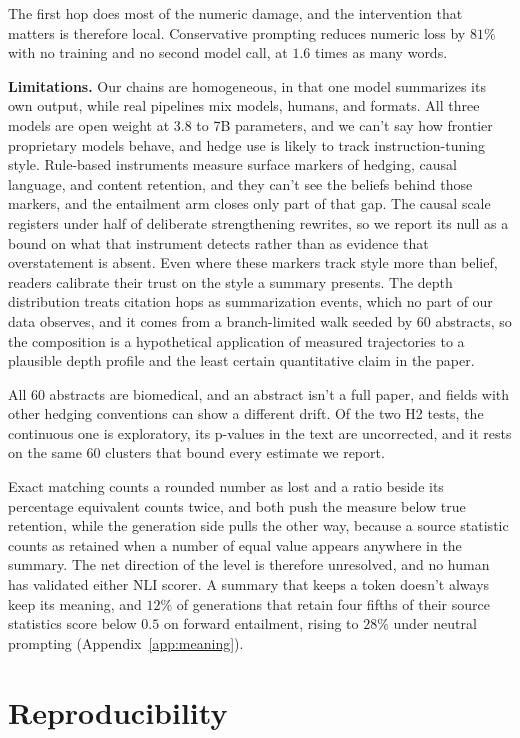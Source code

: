 \documentclass{article}
\begin{document}
The first hop does most of the numeric damage, and the intervention that matters is therefore local. Conservative prompting reduces numeric loss by $81\%$ with no training and no second model call, at $1.6$ times as many words.

\textbf{Limitations.} Our chains are homogeneous, in that one model summarizes its own output, while real pipelines mix models, humans, and formats. All three models are open weight at 3.8 to 7B parameters, and we can't say how frontier proprietary models behave, and hedge use is likely to track instruction-tuning style. Rule-based instruments measure surface markers of hedging, causal language, and content retention, and they can't see the beliefs behind those markers, and the entailment arm closes only part of that gap. The causal scale registers under half of deliberate strengthening rewrites, so we report its null as a bound on what that instrument detects rather than as evidence that overstatement is absent. Even where these markers track style more than belief, readers calibrate their trust on the style a summary presents. The depth distribution treats citation hops as summarization events, which no part of our data observes, and it comes from a branch-limited walk seeded by 60 abstracts, so the composition is a hypothetical application of measured trajectories to a plausible depth profile and the least certain quantitative claim in the paper. 

All 60 abstracts are biomedical, and an abstract isn't a full paper, and fields with other hedging conventions can show a different drift. Of the two H2 tests, the continuous one is exploratory, its p-values in the text are uncorrected, and it rests on the same 60 clusters that bound every estimate we report. 

Exact matching counts a rounded number as lost and a ratio beside its percentage equivalent counts twice, and both push the measure below true retention, while the generation side pulls the other way, because a source statistic counts as retained when a number of equal value appears anywhere in the summary. The net direction of the level is therefore unresolved, and no human has validated either NLI scorer. A summary that keeps a token doesn't always keep its meaning, and $12\%$ of generations that retain four fifths of their source statistics score below $0.5$ on forward entailment, rising to $28\%$ under neutral prompting (Appendix~\ref{app:meaning}).

\section{Reproducibility}
\label{sec:repro}
\end{document}
